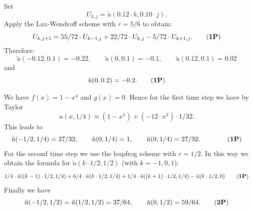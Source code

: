 \begin{loesung}
\begin{teilaufgaben}
\item
Set
\[
U_{k,j} = \tilde u(0.12 \cdot k , 0.10 \cdot j).
\]
Apply the Lax-Wendroff scheme with $r = 5/6$ to obtain:
\begin{equation}
U_{k,j+1}
=
55/72 \cdot U_{k-1,j} + 22/72 \cdot U_{k,j} - 5/72 \cdot U_{k+1,j}.
\tag{{\bf 1P}}
\end{equation}
Therefore:
\[
\tilde u(-0.12,0.1) = -0.22,
\qquad
\tilde u(0,0.1) = -0.1,
\qquad
\tilde u(0.12,0.1) = 0.02
\]
and
\begin{equation}
\tilde u(0,0.2) = -0.2.
\tag{{\bf 1P}}
\end{equation}

\item
We have $f(x) = 1-x^4$ and $g(x) = 0$.
Hence for the first time step we have by Taylor
\[
u(x,1/4) \approx (1-x^4) + (-12 \cdot x^2) \cdot 1/32.
\]
This leads to 
\begin{equation}
\tilde u(-1/2, 1/4)
=
27/32, \qquad \tilde u(0, 1/4) = 1, \qquad \tilde u(0, 1/4) = 27/32. \qquad
\tag{{\bf 1P}}
\end{equation}    
For the second time step we use the leapfrog scheme with $r = 1/2$.
In this way we obtain the formula for $\tilde u(k \cdot 1/2, 1/2)$
(with $k = -1,0,1$):
\begin{equation}
1/4 \cdot \tilde u((k-1) \cdot 1/2, 1/4)
+ 6/4 \cdot \tilde u(k \cdot 1/2,1/4)
+ 1/4 \cdot  \tilde u((k+1) \cdot 1/2, 1/4)
- \tilde u(k \cdot 1/2,0)
\tag{{\bf 1P}}
\end{equation}
Finally we have
\begin{equation}
\tilde u(-1/2, 1/2)
=
\tilde u(1/2, 1/2) = 37/64, \qquad
\tilde u(0, 1/2) = 59/64.
\tag{{\bf 2P}}
\end{equation}
\end{teilaufgaben}
\end{loesung}

